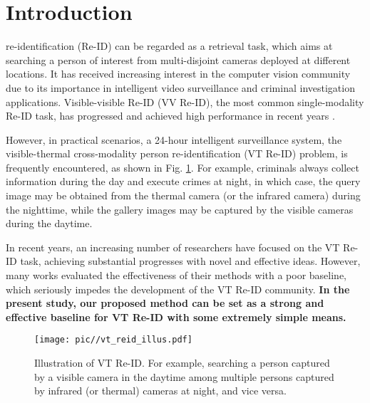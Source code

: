\documentclass[journal]{IEEEtran}
\begin{document}
\section{Introduction}
\label{sec:intro}
 re-identification (Re-ID) can be regarded as a retrieval task, which aims at searching a person of interest from multi-disjoint cameras deployed at different locations. It has received increasing interest in the computer vision community due to its importance in intelligent video surveillance and criminal investigation applications. Visible-visible Re-ID (VV Re-ID), the most common single-modality Re-ID task, has progressed and achieved high performance in recent years \cite{Ye2020DeepLF}.

However, in practical scenarios, a 24-hour intelligent surveillance system, the visible-thermal cross-modality person re-identification (VT Re-ID) problem, is frequently encountered, as shown in Fig. \ref{fig:vt_reid_illus}. For example, criminals always collect information during the day and execute crimes at night, in which case, the query image may be obtained from the thermal camera (or the infrared camera) during the nighttime, while the gallery images may be captured by the visible cameras during the daytime.


In recent years, an increasing number of researchers have focused on the VT Re-ID task, achieving substantial progresses with novel and effective ideas. However, many works evaluated the effectiveness of their methods with a poor baseline, which seriously impedes the development of the VT Re-ID community. \textbf{In the present study, our proposed method can be set as a strong and effective baseline for VT Re-ID with some extremely simple means.}

\begin{figure}
\centering
\texttt{[image: pic//vt\_reid\_illus.pdf]}
\caption{Illustration of VT Re-ID. For example, searching a person captured by a visible camera in the daytime among multiple persons captured by infrared (or thermal) cameras at night, and vice versa. }
\label{fig:vt_reid_illus}
\end{figure}
\end{document}
